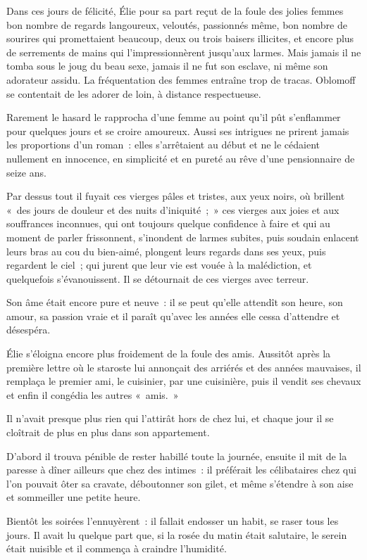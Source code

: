 \documentclass[french,twoside]{book} %
\begin{document}
Dans ces jours de félicité, Élie pour sa part reçut de la foule des jolies femmes bon nombre de regards langoureux, veloutés, passionnés même, bon nombre de sourires qui promettaient beaucoup, deux ou trois baisers illicites, et encore plus de serrements de mains qui l’impressionnèrent jusqu’aux larmes. Mais jamais il ne tomba sous le joug du beau sexe, jamais il ne fut son esclave, ni même son adorateur assidu. La fréquentation des femmes entraîne trop de tracas. Oblomoff se contentait de les adorer de loin, à distance respectueuse.\par
Rarement le hasard le rapprocha d’une femme au point qu’il pût s’enflammer pour quelques jours et se croire amoureux. Aussi ses intrigues ne prirent jamais les proportions d’un roman : elles s’arrêtaient au début et ne le cédaient nullement en innocence, en simplicité et en pureté au rêve d’une pensionnaire de seize ans.\par
Par dessus tout il fuyait ces vierges pâles et tristes, aux yeux noirs, où brillent « des jours de douleur et des nuits d’iniquité ; » ces vierges aux joies et aux souffrances inconnues, qui ont toujours quelque confidence à faire et qui au moment de parler frissonnent, s’inondent de larmes subites, puis soudain enlacent leurs bras au cou du bien-aimé, plongent leurs regards dans ses yeux, puis regardent le ciel ; qui jurent que leur vie est vouée à la malédiction, et quelquefois s’évanouissent. Il se détournait de ces vierges avec terreur.\par
Son âme était encore pure et neuve : il se peut qu’elle attendît son heure, son amour, sa passion vraie et il paraît qu’avec les années elle cessa d’attendre et désespéra.\par
Élie s’éloigna encore plus froidement de la foule des amis. Aussitôt après la première lettre où le staroste lui annonçait des arriérés et des années mauvaises, il remplaça le premier ami, le cuisinier, par une cuisinière, puis il vendit ses chevaux et enfin il congédia les autres « amis. »\par
Il n’avait presque plus rien qui l’attirât hors de chez lui, et chaque jour il se cloîtrait de plus en plus dans son appartement.\par
D’abord il trouva pénible de rester habillé toute la journée, ensuite il mit de la paresse à dîner ailleurs que chez des intimes : il préférait les célibataires chez qui l’on pouvait ôter sa cravate, déboutonner son gilet, et même s’étendre à son aise et sommeiller une petite heure.\par
Bientôt les soirées l’ennuyèrent : il fallait endosser un habit, se raser tous les jours. Il avait lu quelque part que, si la rosée du matin était salutaire, le serein était nuisible et il commença à craindre l’humidité.\par
\end{document}
